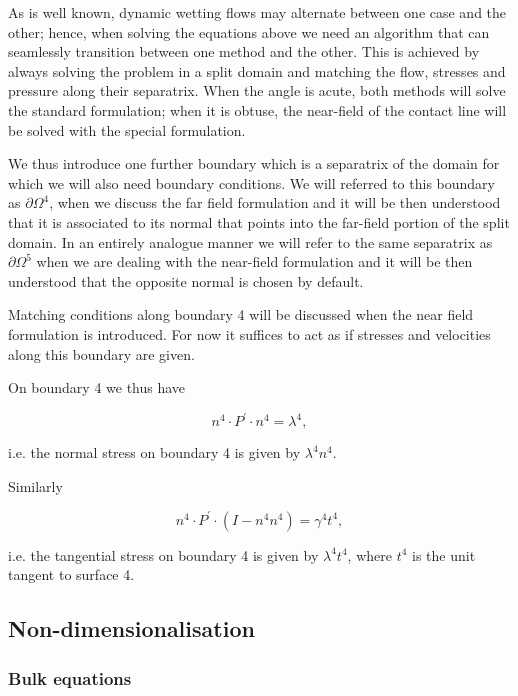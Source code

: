 \documentclass{article}
\begin{document}
As is well known, dynamic wetting flows may alternate between one case and the other; hence, when solving the equations above we need an algorithm that can seamlessly transition between one method and the other. This is achieved by always solving the problem in a split domain and matching the flow, stresses and pressure along their separatrix. When the angle is acute, both methods will solve the standard formulation; when it is obtuse, the near-field of the contact line will be solved with the special formulation.

We thus introduce one further boundary which is a separatrix of the domain for which we will also need boundary conditions. We will referred to this boundary as \(\partial \Omega^4\), when we discuss the far field formulation and it will be then understood that it is associated to its normal that points into the far-field portion of the split domain. In an entirely analogue manner we will refer to the same separatrix as \(\partial \Omega^5\) when we are dealing with the near-field formulation and it will be then understood that the opposite normal is chosen by default.

Matching conditions along boundary 4 will be discussed when the near field formulation is introduced. For now it suffices to act as if stresses and velocities along this boundary are given.

On boundary 4 we thus have

\begin{equation}
n^4\cdot P^{\prime}\cdot n^4 = \lambda^4, \tag{2.34}
\end{equation}

i.e. the normal stress on boundary 4 is given by \(\lambda^4 n^4\).

Similarly

\begin{equation}
n^4\cdot P^{\prime}\cdot (I - n^4 n^4) = \gamma^4 t^4, \tag{2.35}
\end{equation}

i.e. the tangential stress on boundary 4 is given by \(\lambda^4 t^4\), where \(t^4\) is the unit tangent to surface 4.

\subsection{Non-dimensionalisation}

\subsubsection{Bulk equations}
\end{document}

